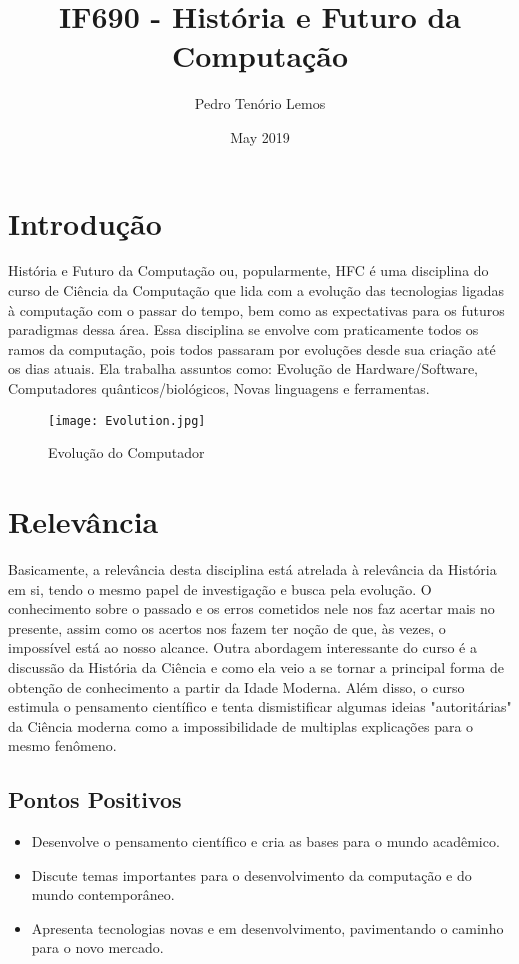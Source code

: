 ﻿\documentclass{article}
\title{IF690 - História e Futuro da Computação}
\author{Pedro Tenório Lemos}
\date{May 2019}
\begin{document}
\maketitle

\section{Introdução}

História e Futuro da Computação ou, popularmente, HFC é uma disciplina do curso de Ciência da Computação que lida com a evolução das tecnologias ligadas à computação com o passar do tempo, bem como as expectativas para os futuros paradigmas dessa área. \cite{cinwikiif690} Essa disciplina se envolve com praticamente todos os ramos da computação, pois todos passaram por evoluções desde sua criação até os dias atuais. Ela trabalha assuntos como: Evolução de Hardware/Software, Computadores quânticos/biológicos, Novas linguagens e ferramentas. \cite{cingradif690}

\begin{figure}[h!]
    \centering
    \texttt{[image: Evolution.jpg]}
    \caption{Evolução do Computador \cite{figura}}
    \label{fig:evolution}
\end{figure}

\section{Relevância}
Basicamente, a relevância desta disciplina está atrelada à relevância da História em si, tendo o mesmo papel de investigação e busca pela evolução. O conhecimento sobre o passado e os erros cometidos nele nos faz acertar mais no presente, assim como os acertos nos fazem ter noção de que, às vezes, o impossível está ao nosso alcance. \cite{hdccleuzio} Outra abordagem interessante do curso é a discussão da História da Ciência e como ela veio a se tornar a principal forma de obtenção de conhecimento a partir da Idade Moderna. Além disso, o curso estimula o pensamento científico e tenta dismistificar algumas ideias "autoritárias" da Ciência moderna como a impossibilidade de multiplas explicações para o mesmo fenômeno. \cite{ssrthomas}  

\subsection{Pontos Positivos}

\begin{itemize}
    \item Desenvolve o pensamento científico e cria as bases para o mundo acadêmico.
    \item Discute temas importantes para o desenvolvimento da computação e do mundo contemporâneo.
    \item Apresenta tecnologias novas e em desenvolvimento, pavimentando o caminho para o novo mercado.
\end{itemize}
\end{document}
